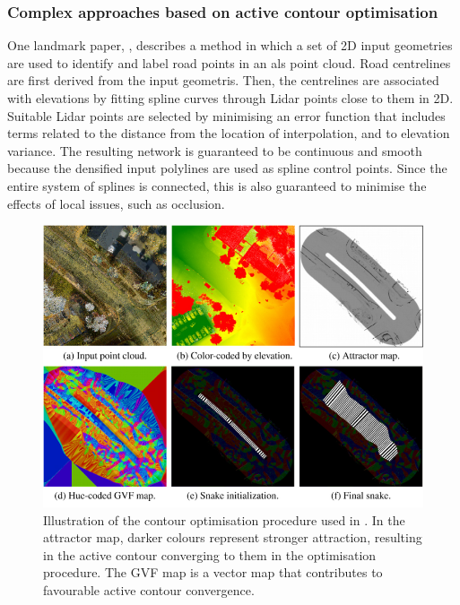 \subsubsection{Complex approaches based on active contour optimisation}

One landmark paper, \cite{boyko_funkhauser_2011}, describes a method in which a set of 2D input geometries are used to identify and label road points in an \ac{als} point cloud. Road centrelines are first derived from the input geometris. Then, the centrelines are associated with elevations by fitting spline curves through Lidar points close to them in 2D. Suitable Lidar points are selected by minimising an error function that includes terms related to the distance from the location of interpolation, and to elevation variance. The resulting network is guaranteed to be continuous and smooth because the densified input polylines are used as spline control points. Since the entire system of splines is connected, this is also guaranteed to minimise the effects of local issues, such as occlusion.

\begin{figure}
    \centering
    \includegraphics[width=0.85\linewidth]{final_report/figs/boyko_funkahuser_2011_01.png} 
    \caption[Illustration of a contour optimisation procedure]{Illustration of the contour optimisation procedure used in \cite{boyko_funkhauser_2011}. In the attractor map, darker colours represent stronger attraction, resulting in the active contour converging to them in the optimisation procedure. The GVF map is a vector map that contributes to favourable active contour convergence.}
    \label{fig:boykofunkhauser2011}
\end{figure}

